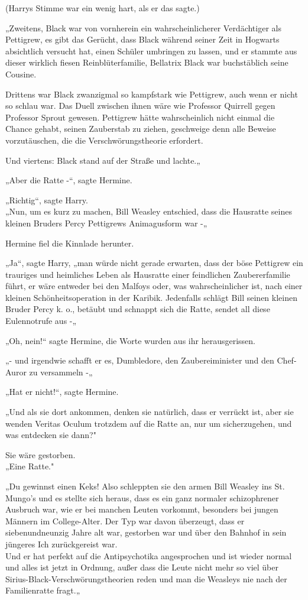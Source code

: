 {(Harrys Stimme war ein wenig hart, als er das sagte.)

„Zweitens, Black war von vornherein ein wahrscheinlicherer Verdächtiger als Pettigrew, es gibt das Gerücht, dass Black während seiner Zeit in Hogwarts absichtlich versucht hat, einen Schüler umbringen zu lassen, und er stammte aus dieser wirklich fiesen Reinblüterfamilie, Bellatrix Black war buchstäblich seine Cousine.

Drittens war Black zwanzigmal so kampfstark wie Pettigrew, auch wenn er nicht so schlau war. Das Duell zwischen ihnen wäre wie Professor Quirrell gegen Professor Sprout gewesen. Pettigrew hätte wahrscheinlich nicht einmal die Chance gehabt, seinen Zauberstab zu ziehen, geschweige denn alle Beweise vorzutäuschen, die die Verschwörungstheorie erfordert.

Und viertens: Black stand auf der Straße und lachte.„

„Aber die Ratte -“, sagte Hermine.

„Richtig“, sagte Harry.\\ „Nun, um es kurz zu machen, Bill Weasley entschied, dass die Hausratte seines kleinen Bruders Percy Pettigrews Animagusform war -„

Hermine fiel die Kinnlade herunter.

„Ja“, sagte Harry, „man würde nicht gerade erwarten, dass der böse Pettigrew ein trauriges und heimliches Leben als Hausratte einer feindlichen Zaubererfamilie führt, er wäre entweder bei den Malfoys oder, was wahrscheinlicher ist, nach einer kleinen Schönheitsoperation in der Karibik. Jedenfalls schlägt Bill seinen kleinen Bruder Percy k. o., betäubt und schnappt sich die Ratte, sendet all diese Eulennotrufe aus -„

„Oh, nein!“ sagte Hermine, die Worte wurden aus ihr herausgerissen.

„- und irgendwie schafft er es, Dumbledore, den Zaubereiminister und den Chef-Auror zu versammeln -„

„Hat er nicht!“, sagte Hermine.

„Und als sie dort ankommen, denken sie natürlich, dass er verrückt ist, aber sie wenden Veritas Oculum trotzdem auf die Ratte an, nur um sicherzugehen, und was entdecken sie dann?"

Sie wäre gestorben.\\ „Eine Ratte."

„Du gewinnst einen Keks! Also schleppten sie den armen Bill Weasley ins St. Mungo's und es stellte sich heraus, dass es ein ganz normaler schizophrener Ausbruch war, wie er bei manchen Leuten vorkommt, besonders bei jungen Männern im College-Alter. Der Typ war davon überzeugt, dass er siebenundneunzig Jahre alt war, gestorben war und über den Bahnhof in sein jüngeres Ich zurückgereist war.\\ Und er hat perfekt auf die Antipsychotika angesprochen und ist wieder normal und alles ist jetzt in Ordnung, außer dass die Leute nicht mehr so viel über Sirius-Black-Verschwörungstheorien reden und man die Weasleys nie nach der Familienratte fragt.„

}
